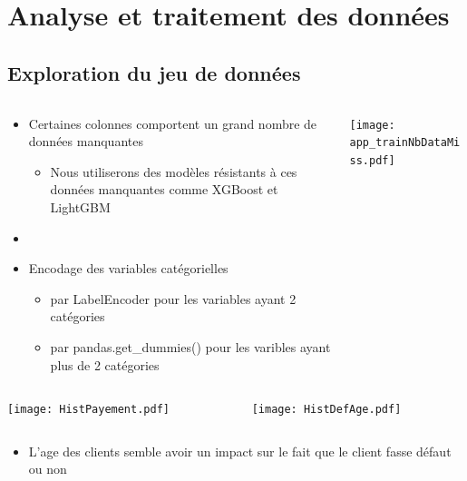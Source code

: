 \documentclass[8pt,aspectratio=169,hyperref={unicode=true}]{beamer}
\begin{document}
\section{Analyse et traitement des données}
\subsection{Exploration du jeu de données}
\begin{frame}{\insertsection}{\insertsubsection}
    \begin{columns}
        \begin{column}{.4\textwidth}
            \begin{itemize}
                \item Certaines colonnes comportent un grand nombre de données manquantes
                      \begin{itemize}
                          \item Nous utiliserons des modèles résistants à ces données manquantes comme XGBoost et LightGBM
                      \end{itemize}
                \item[]
                \item Encodage des variables catégorielles
                      \begin{itemize}
                          \item par LabelEncoder pour les variables ayant 2 catégories
                          \item par pandas.get\_dummies() pour les varibles ayant plus de 2 catégories
                      \end{itemize}
            \end{itemize}
        \end{column}
        \begin{column}{.6\textwidth}
            \texttt{[image: app\_trainNbDataMiss.pdf]}
        \end{column}
    \end{columns}
\end{frame}

\begin{frame}{\insertsection}{\insertsubsection}
    \begin{columns}
        \begin{column}{.5\textwidth}
            \texttt{[image: HistPayement.pdf]}
        \end{column}
        \begin{column}{.5\textwidth}
            \texttt{[image: HistDefAge.pdf]}
        \end{column}
    \end{columns}
    \begin{itemize}
        \item L'age des clients semble avoir un impact sur le fait que le client fasse défaut ou non
    \end{itemize}
\end{frame}
\end{document}
